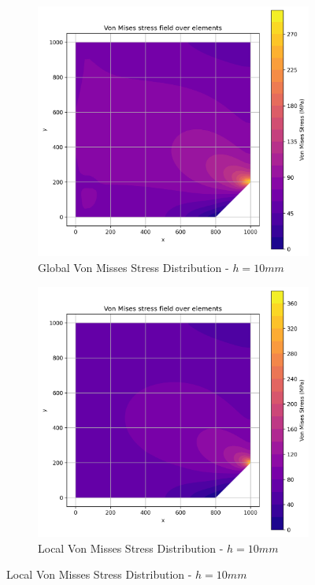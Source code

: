 \begin{figure}[H]
  \centering
  \begin{subfigure}[b]{0.45\textwidth}
    \centering
    \includegraphics[width=\textwidth]{GRAFICOS/Quad9/1.25mm_global/resultados_von_mises.png}
    \caption{Global Von Misses Stress Distribution - $h=10mm$}
    \label{fig:img13}
  \end{subfigure}
  \hfill
  \begin{subfigure}[b]{0.45\textwidth}
    \centering
    \includegraphics[width=\textwidth]{GRAFICOS/Quad9/1.25mm_local/resultados_von_mises.png}
    \caption{Local Von Misses Stress Distribution - $h=10mm$}
    \label{fig:img23}
  \end{subfigure}
\end{figure}

